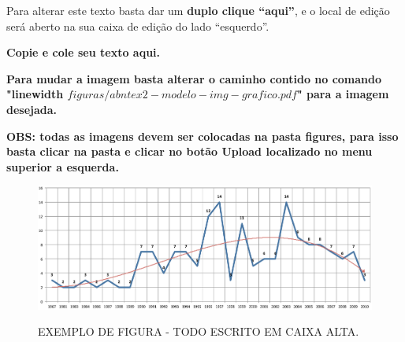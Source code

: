 
Para alterar este texto basta dar um 
\textbf{duplo clique “aqui”}, e o local de edição será aberto na sua caixa de edição do lado “esquerdo”.

\textbf{Copie e cole seu texto aqui.}

\textbf{Para mudar a imagem basta alterar o caminho contido no comando "linewidth ${figuras/abntex2-modelo-img-grafico.pdf}$" para a imagem desejada.}

\textbf{OBS: todas as imagens devem ser colocadas na pasta figures, para isso basta clicar na pasta e clicar no botão Upload localizado no menu superior a esquerda. 
}

\begin{figure}[H]
\begin{center}
\caption{EXEMPLO DE FIGURA - TODO ESCRITO EM CAIXA ALTA.}
\includegraphics[width=12cm]{figuras/abntex2-modelo-img-grafico.pdf}
\label{fig:controleUComparativo}
\end{center}
\end{figure}

